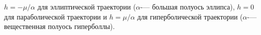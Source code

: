 $h=-\mu/\alpha$ для эллиптической траектории ($\alpha$-— большая полуось эллипса), $h=0$ для параболической траектории и $h=\mu/\alpha$
для гиперболической траектории ($\alpha$-— вещественная полуось гиперболлы).